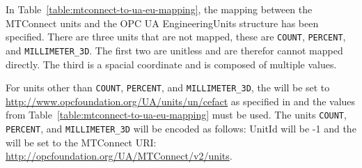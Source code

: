 In Table~\ref{table:mtconnect-to-ua-eu-mapping}, the mapping between the MTConnect units and the OPC UA EngineeringUnits structure has been specified. There are three units that are not mapped, these are \texttt{COUNT}, \texttt{PERCENT}, and \texttt{MILLIMETER_3D}. The first two are unitless and are therefor cannot mapped directly. The third is a spacial coordinate and is composed of multiple values.

For units other than  \texttt{COUNT}, \texttt{PERCENT}, and \texttt{MILLIMETER_3D}, the  will be set to \url{http://www.opcfoundation.org/UA/units/un/cefact} as specified in \cite{UAPart8} and the values from Table~\ref{table:mtconnect-to-ua-eu-mapping} must be used. The units \texttt{COUNT}, \texttt{PERCENT}, and \texttt{MILLIMETER_3D} will be encoded as follows: UnitId will be -1 and the  will be set to the MTConnect URI: \url{http://opcfoundation.org/UA/MTConnect/v2/units}.  

